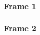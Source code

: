 \documentclass{beamer}
\begin{document}
\begin{frame}
    \frametitle{Frame 1}
\end{frame} 

\begin{frame}
    \frametitle{Frame 2}
\end{frame}
\end{document}
